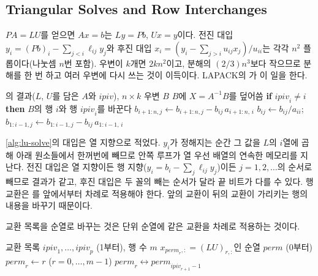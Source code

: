\subsection{Triangular Solves and Row Interchanges}

$PA=LU$를 얻으면 $Ax=b$는 $Ly=Pb$, $Ux=y$이다. 전진 대입 $y_i=(Pb)_i-\sum_{j<i}\ell_{ij}y_j$와 후진 대입 $x_i=(y_i-\sum_{j>i}u_{ij}x_j)/u_{ii}$는 각각 $n^2$ 플롭이다(나눗셈 $n$번 포함). 우변이 $k$개면 $2kn^2$이고, 분해의 $(2/3)n^3$보다 작으므로 분해를 한 번 하고 여러 우변에 다시 쓰는 것이 이득이다. LAPACK의 가 이 일을 한다.

\begin{algorithm}[t]
\begin{algorithmic}[1]
\Require {}의 결과($L$, $U$를 담은 $A$와 $\mathit{ipiv}$), $n\times k$ 우변 $B$
\Ensure $B$에 $X=A^{-1}B$를 덮어씀
 
  \State \textbf{if} $\mathit{ipiv}_i\ne i$ \textbf{then} $B$의 행 $i$와 행 $\mathit{ipiv}_i$를 바꾼다
\EndFor
{} 
   
    \State $b_{i+1:n,j}\gets b_{i+1:n,j}-b_{ij}\,a_{i+1:n,\,i}$
  \EndFor
   
    \State $b_{ij}\gets b_{ij}/a_{ii}$; \ $b_{1:i-1,j}\gets b_{1:i-1,j}-b_{ij}\,a_{1:i-1,\,i}$
  \EndFor
\EndFor
\end{algorithmic}
\caption{인수로 풀기 (의  경우; 열 지향의 대입)}
\label{alg:lu-solve}
\end{algorithm}

\cref{alg:lu-solve}의 대입은 열 지향으로 적었다. $y_i$가 정해지는 순간 그 값을 $L$의 $i$열에 곱해 아래 원소들에서 한꺼번에 빼므로 안쪽 루프가 열 우선 배열의 연속한 메모리를 지난다. 전진 대입은 열 지향이든 행 지향($y_i=b_i-\sum_j\ell_{ij}y_j$)이든 $j=1,2,\dots$의 순서로 빼므로 결과가 같고, 후진 대입은 두 꼴의 빼는 순서가 달라 끝 비트가 다를 수 있다. 행 교환은 를 앞에서부터 차례로 적용해야 한다. 앞의 교환이 뒤의 교환이 가리키는 행의 내용을 바꾸기 때문이다.

교환 목록을 순열로 바꾸는 것은 단위 순열에 같은 교환을 차례로 적용하는 것이다.

\begin{algorithm}[t]
\begin{algorithmic}[1]
\Require 교환 목록 $\mathit{ipiv}_1,\dots,\mathit{ipiv}_p$ (1부터), 행 수 $m$
\Ensure $x_{\mathit{perm}_r,:}=(LU)_{r,:}$인 순열 $\mathit{perm}$ (0부터)
\State $\mathit{perm}_r\gets r$ ($r=0,\dots,m-1$)
  \State $\mathit{perm}_r\leftrightarrow\mathit{perm}_{\mathit{ipiv}_{r+1}-1}$
\EndFor
\end{algorithmic}
\caption{교환 목록에서 순열로 (stardust 의 )}
\label{alg:lu-perm}
\end{algorithm}

